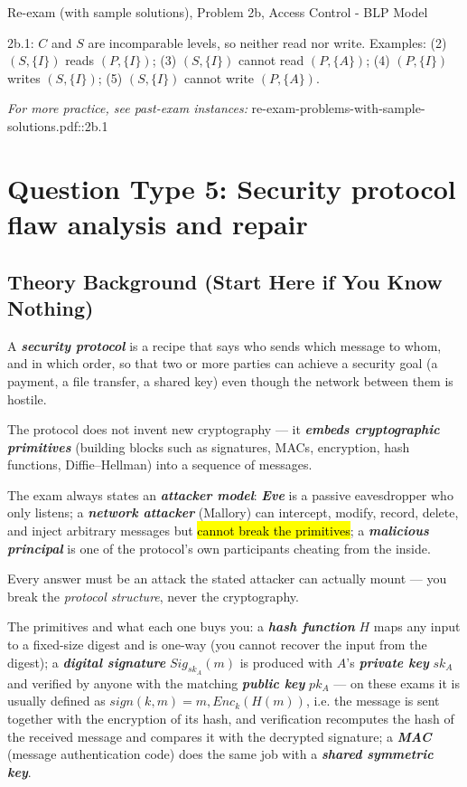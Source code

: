 \documentclass[12pt, a4paper]{article}
\newcommand{\term}[1]{\textbf{\textit{#1}}}        %
\newcommand{\imp}[1]{\hl{#1}}                       %
\begin{document}
\begin{practicebox}{Re-exam (with sample solutions), Problem 2b, Access Control - BLP Model}
\begin{answerbox}
2b.1: $C$ and $S$ are incomparable levels, so neither read nor write. Examples: (2) $(S,\{I\})$ reads $(P,\{I\})$; (3) $(S,\{I\})$ cannot read $(P,\{A\})$; (4) $(P,\{I\})$ writes $(S,\{I\})$; (5) $(S,\{I\})$ cannot write $(P,\{A\})$.
\end{answerbox}
\end{practicebox}

\textit{For more practice, see past-exam instances:} re-exam-problems-with-sample-solutions.pdf::2b.1

\section{Question Type 5: Security protocol flaw analysis and repair}

\subsection*{Theory Background (Start Here if You Know Nothing)}

A \term{security protocol} is a recipe that says who sends which message to whom, and in which order, so that two or more parties can achieve a security goal (a payment, a file transfer, a shared key) even though the network between them is hostile.

The protocol does not invent new cryptography --- it \term{embeds cryptographic primitives} (building blocks such as signatures, MACs, encryption, hash functions, Diffie--Hellman) into a sequence of messages.

The exam always states an \term{attacker model}: \term{Eve} is a passive eavesdropper who only listens; a \term{network attacker} (Mallory) can intercept, modify, record, delete, and inject arbitrary messages but \imp{cannot break the primitives}; a \term{malicious principal} is one of the protocol's own participants cheating from the inside.

Every answer must be an attack the stated attacker can actually mount --- you break the \emph{protocol structure}, never the cryptography.

The primitives and what each one buys you: a \term{hash function} $H$ maps any input to a fixed-size digest and is one-way (you cannot recover the input from the digest); a \term{digital signature} $Sig_{sk_A}(m)$ is produced with $A$'s \term{private key} $sk_A$ and verified by anyone with the matching \term{public key} $pk_A$ --- on these exams it is usually defined as $sign(k, m) = m, Enc_k(H(m))$, i.e. the message is sent together with the encryption of its hash, and verification recomputes the hash of the received message and compares it with the decrypted signature; a \term{MAC} (message authentication code) does the same job with a \term{shared symmetric key}.
\end{document}
